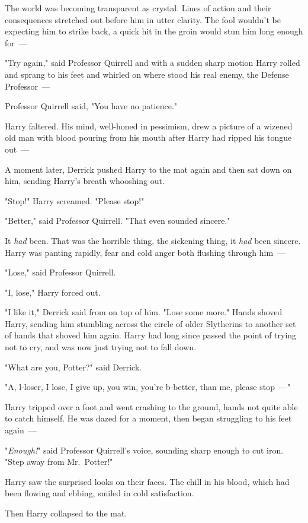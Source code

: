 The world was becoming transparent as crystal. Lines of action and their
consequences stretched out before him in utter clarity. The fool wouldn't be
expecting him to strike back, a quick hit in the groin would stun him long
enough for~---

"Try again," said Professor Quirrell and with a sudden sharp motion Harry
rolled and sprang to his feet and whirled on where stood his real enemy, the
Defense Professor~---

Professor Quirrell said, "You have no patience."

Harry faltered. His mind, well-honed in pessimism, drew a picture of a wizened
old man with blood pouring from his mouth after Harry had ripped his tongue
out~---

A moment later, Derrick pushed Harry to the mat again and then sat down on him,
sending Harry's breath whooshing out.

"Stop!" Harry screamed. "Please stop!"

"Better," said Professor Quirrell. "That even sounded sincere."

It \emph{had} been. That was the horrible thing, the sickening thing, it
\emph{had} been sincere. Harry was panting rapidly, fear and cold anger both
flushing through him~---

"Lose," said Professor Quirrell.

"I, lose," Harry forced out.

"I like it," Derrick said from on top of him. "Lose some more."
\sbreak
Hands shoved Harry, sending him stumbling across the circle of older Slytherins
to another set of hands that shoved him again. Harry had long since passed the
point of trying not to cry, and was now just trying not to fall down.

"What are you, Potter?" said Derrick.

"A, l-loser, I lose, I give up, you win, you're b-better, than me, please
stop~---"

Harry tripped over a foot and went crashing to the ground, hands not quite able
to catch himself. He was dazed for a moment, then began struggling to his feet
again~---

"\emph{Enough!}" said Professor Quirrell's voice, sounding sharp enough to cut
iron. "Step away from Mr.~Potter!"

Harry saw the surprised looks on their faces. The chill in his blood, which had
been flowing and ebbing, smiled in cold satisfaction.

Then Harry collapsed to the mat.

